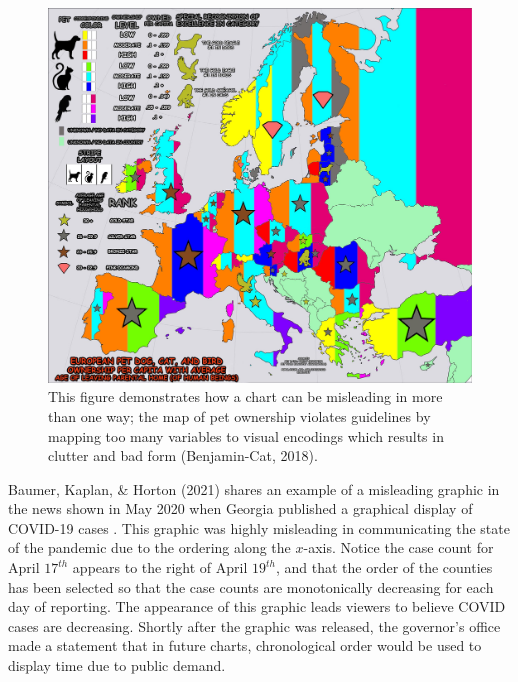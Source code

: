 \documentclass[print]{nuthesis}
\begin{document}
\begin{figure}[tbp]

{\centering \includegraphics[width=0.5\linewidth,]{images/misleading-graphics-multiple-issues-pet-ownership} 

}

\caption[Misleading graphic multiple violations example]{This figure demonstrates how a chart can be misleading in more than one way; the map of pet ownership violates guidelines by mapping too many variables to visual encodings which results in clutter and bad form (Benjamin-Cat, 2018).}\label{fig:misleading-graphics-just-bad}
\end{figure}

Baumer, Kaplan, \& Horton (2021) shares an example of a misleading graphic in the news shown in May 2020 when Georgia published a graphical display of COVID-19 cases .
This graphic was highly misleading in communicating the state of the pandemic due to the ordering along the \(x\)-axis.
Notice the case count for April \(17^{th}\) appears to the right of April \(19^{th}\), and that the order of the counties has been selected so that the case counts are monotonically decreasing for each day of reporting.
The appearance of this graphic leads viewers to believe COVID cases are decreasing.
Shortly after the graphic was released, the governor's office made a statement that in future charts, chronological order would be used to display time due to public demand.
\end{document}
